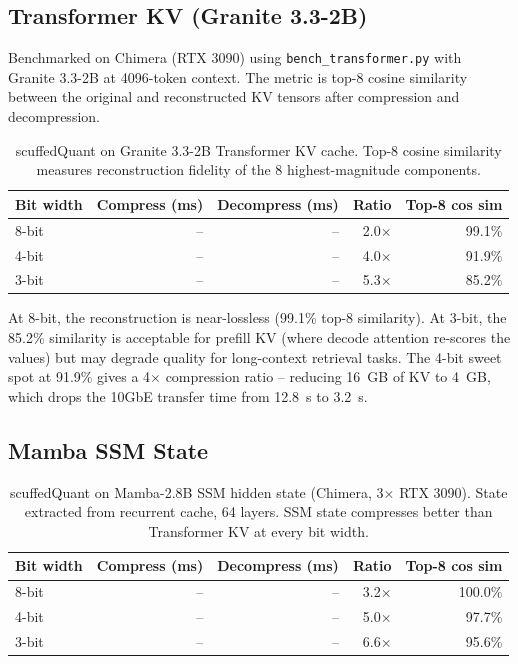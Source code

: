 \documentclass[11pt,letterpaper]{article}
\begin{document}
\subsection{Transformer KV (Granite 3.3-2B)}
\label{sec:sq_transformer}

Benchmarked on Chimera (RTX 3090) using \texttt{bench\_transformer.py} with Granite 3.3-2B at 4096-token context. The metric is top-8 cosine similarity between the original and reconstructed KV tensors after compression and decompression.

\begin{table}[ht]
\centering\small
\begin{tabular}{lrrrr}
\toprule
\textbf{Bit width} & \textbf{Compress (ms)} & \textbf{Decompress (ms)} & \textbf{Ratio} & \textbf{Top-8 cos sim} \\
\midrule
8-bit & -- & -- & 2.0$\times$ & 99.1\% \\
4-bit & -- & -- & 4.0$\times$ & 91.9\% \\
3-bit & -- & -- & 5.3$\times$ & 85.2\% \\
\bottomrule
\end{tabular}
\caption{scuffedQuant on Granite 3.3-2B Transformer KV cache. Top-8 cosine similarity measures reconstruction fidelity of the 8 highest-magnitude components.}
\label{tab:sq_transformer}
\end{table}

At 8-bit, the reconstruction is near-lossless (99.1\% top-8 similarity). At 3-bit, the 85.2\% similarity is acceptable for prefill KV (where decode attention re-scores the values) but may degrade quality for long-context retrieval tasks. The 4-bit sweet spot at 91.9\% gives a 4$\times$ compression ratio -- reducing 16~GB of KV to 4~GB, which drops the 10GbE transfer time from 12.8~s to 3.2~s.

\subsection{Mamba SSM State}
\label{sec:sq_mamba}

\begin{table}[ht]
\centering\small
\begin{tabular}{lrrrr}
\toprule
\textbf{Bit width} & \textbf{Compress (ms)} & \textbf{Decompress (ms)} & \textbf{Ratio} & \textbf{Top-8 cos sim} \\
\midrule
8-bit & -- & -- & 3.2$\times$ & 100.0\% \\
4-bit & -- & -- & 5.0$\times$ & 97.7\% \\
3-bit & -- & -- & 6.6$\times$ & 95.6\% \\
\bottomrule
\end{tabular}
\caption{scuffedQuant on Mamba-2.8B SSM hidden state (Chimera, 3$\times$ RTX 3090). State extracted from recurrent cache, 64 layers. SSM state compresses better than Transformer KV at every bit width.}
\label{tab:sq_mamba}
\end{table}
\end{document}
